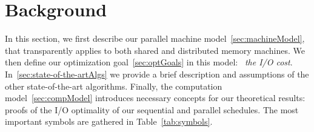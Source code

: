 \documentclass[sigplan,review,anonymous,10pt]{acmart}\settopmatter{printfolios=true,printccs=false,printacmref=false}
\newcommand\mac[1]{\textcolor{red}{[Mac: #1]}}
\begin{document}
%
%

%


%

\vspace{-1em}
\section{Background}

In this section, we first describe our parallel machine 
model~\cref{sec:machineModel}, that transparently applies to both shared and 
distributed memory machines. We then define our optimization 
goal~\cref{sec:optGoals} in this model: ~\emph{the I/O cost}. 
In~\cref{sec:state-of-the-artAlgs} we provide a brief description and 
assumptions of the other state-of-the-art algorithms. Finally, the computation 
model~\cref{sec:compModel} 
introduces necessary concepts for our theoretical results: proofs of the I/O 
optimality of our sequential and parallel schedules. The most important symbols 
are gathered 
in 
Table~\ref{tab:symbols}.
\end{document}
